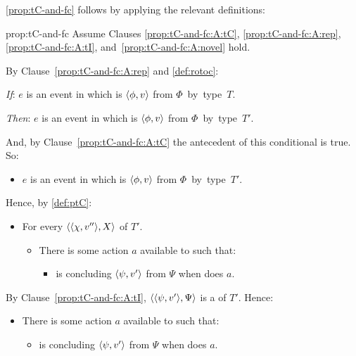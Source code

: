 \begin{note}
  \noindent%
  \autoref{prop:tC-and-fc} follows by applying the relevant definitions:

  \begin{argument}{prop:tC-and-fc}%
    Assume Clauses \ref{prop:tC-and-fc:A:tC}, \ref{prop:tC-and-fc:A:rep}, \ref{prop:tC-and-fc:A:tI}, and~\ref{prop:tC-and-fc:A:novel} hold.

    \noindent%
    By Clause~\ref{prop:tC-and-fc:A:rep} and \autoref{def:rotoc}:

    \begin{itenum}[noitemsep]
    \item[\emph{If}:]
      \(e\) is an event in which \vAgent{} is  \(\langle \phi, v \rangle\) from \(\Phi\)~by~type~\(T\).
    \item[\emph{Then}:]
      \(e\) is an event in which \vAgent{} is  \(\langle \phi, v \rangle\) from \(\Phi\)~by~type~\(T'\).
    \end{itenum}

    \noindent%
    And, by Clause~\ref{prop:tC-and-fc:A:tC} the antecedent of this conditional is true.
    So:

    \begin{itemize}[noitemsep]
    \item
      \(e\) is an event in which \vAgent{} is  \(\langle \phi, v \rangle\) from \(\Phi\)~by~type~\(T'\).
    \end{itemize}

    \noindent%
    Hence, by \autoref{def:ptC}:

    \begin{itemize}[noitemsep]
    \item
      For every \tI{} \(\langle \langle \chi, v'' \rangle, X \rangle\) of \(T'\).
      \begin{itemize}[noitemsep]
      \item
        There is some action \(a\) available to \vAgent{} such that:
        \begin{itemize}[noitemsep]
        \item
          \vAgent{} is concluding \(\langle \psi, v' \rangle\) from \(\Psi\) when \vAgent{} does \(a\).
        \end{itemize}
      \end{itemize}
    \end{itemize}

    \noindent%
    By Clause~\ref{prop:tC-and-fc:A:tI}, \(\langle \langle \psi, v' \rangle, \Psi \rangle\) is a \tI{} of \(T'\).
    Hence:

    \begin{itemize}[noitemsep]
    \item
      There is some action \(a\) available to \vAgent{} such that:
      \begin{itemize}[noitemsep]
      \item
        \vAgent{} is concluding \(\langle \psi, v' \rangle\) from \(\Psi\) when \vAgent{} does \(a\).
      \end{itemize}
    \end{itemize}


\end{argument}
\end{note}
